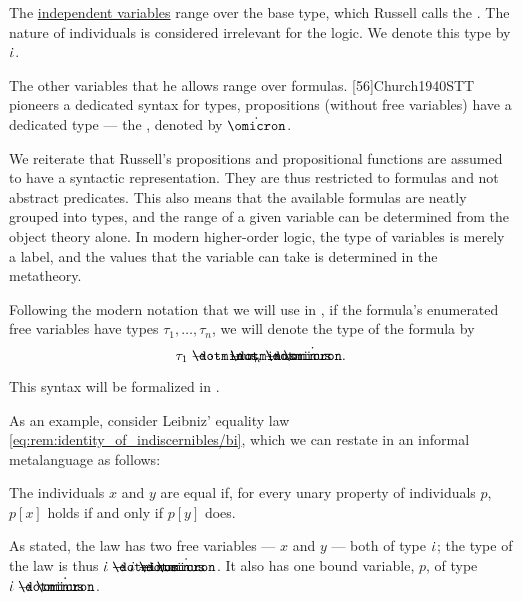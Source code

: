 \begin{concept}
\begin{thmenum}
    The \hyperref[con:variable_dependence]{independent variables} range over the base type, which Russell calls the . The nature of individuals is considered irrelevant for the logic. We denote this type by \( \dot{\iota} \).

    The other variables that he allows range over formulas. [56]{Church1940STT} pioneers a dedicated syntax for types, propositions (without free variables) have a dedicated type --- the , denoted by \( \syn\omicron \).

    We reiterate that Russell's propositions and propositional functions are assumed to have a syntactic representation. They are thus restricted to formulas and not abstract predicates. This also means that the available formulas are neatly grouped into types, and the range of a given variable can be determined from the object theory alone. In modern higher-order logic, the type of variables is merely a label, and the values that the variable can take is determined in the metatheory.

    Following the modern notation that we will use in , if the formula's enumerated free variables have types \( \tau_1, \ldots, \tau_n \), we will denote the type of the formula by
    \begin{equation*}
      \tau_1 \synimplies \cdots \synimplies \tau_n \synimplies \syn\omicron.
    \end{equation*}

    This syntax will be formalized in .

    As an example, consider Leibniz' equality law \eqref{eq:rem:identity_of_indiscernibles/bi}, which we can restate in an informal metalanguage as follows:
    \begin{displayquote}
      The individuals \( x \) and \( y \) are equal if, for every unary property of individuals \( p \), \( p[x] \) holds if and only if \( p[y] \) does.
    \end{displayquote}

    As stated, the law has two free variables --- \( x \) and \( y \) --- both of type \( \dot{\iota} \); the type of the law is thus \( \syn\iota \synimplies \syn\iota \synimplies \syn\omicron \). It also has one bound variable, \( p \), of type \( \syn\iota \synimplies \syn\omicron \).


\end{thmenum}
\end{concept}
